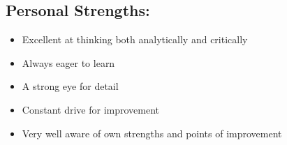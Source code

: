 \documentclass[a4paper,10pt]{article}
\begin{document}
\subsection{Personal Strengths:}
\begin{itemize}
\item Excellent at thinking both analytically and critically
\item Always eager to learn
\item A strong eye for detail
\item Constant drive for improvement
\item Very well aware of own strengths and points of improvement
\end{itemize}
\end{document}
